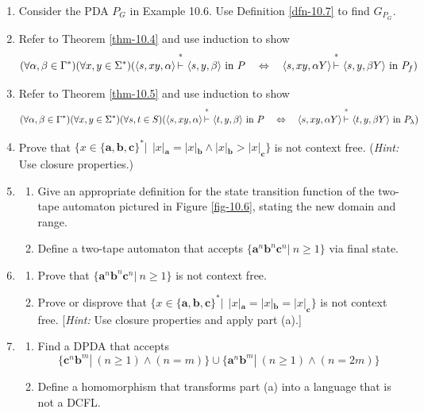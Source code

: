 \begin{enumerate}[{10.}1.]
\item Consider the PDA $P_G$ in Example 10.6. Use Definition \ref{dfn-10.7} to find
$G_{P_G}$.

\item Refer to Theorem \ref{thm-10.4} and use induction to show
\[ (\forall\alpha,\beta\in\Gamma^*)(\forall x,y\in\Sigma^*)(\langle s,xy,\alpha\rangle
	\Dvdash\langle s,y,\beta\rangle\text{ in }P \ \ \  \Leftrightarrow\ \ \ \langle s,xy,
	\alpha Y\rangle\Dvdash\langle s,y,\beta Y\rangle\text{ in }P_{  f}) \]

\item Refer to Theorem \ref{thm-10.5} and use induction to show
\[ (\forall \alpha,\beta\in\Gamma^*)(\forall x,y\in\Sigma^*)(\forall s,t\in S)
	(\langle s,xy,\alpha\rangle\Dvdash\langle t,y,\beta\rangle\text{ in }P
	 \ \ \  \Leftrightarrow\ \ \ \langle s,xy,\alpha Y\rangle\Dvdash\langle t,y,\beta Y\rangle
	\text{ in }P_{\lambda}) \]

\item Prove that $\{x\in\{\pmb{a},\pmb{b},\pmb{c}\}^*|\ \ |x|_{\pmb{a}}=|x|_{
\pmb{b}}\wedge|x|_{\pmb{b}} > |x|_{\pmb{c}}\}$ is not context free.
(\emph{Hint:} Use closure properties.)

\item \begin{enumerate}
\item Give an appropriate definition for the state transition function of
the two-tape automaton pictured in Figure \ref{fig-10.6}, stating the new domain and
range.
\item Define a two-tape automaton that accepts $\{\pmb{a}^n\pmb{b}^n\pmb{c}^n|\ n
\geq 1\}$ via final state.
\end{enumerate}

\item \begin{enumerate}
\item Prove that $\{\pmb{a}^n\pmb{b}^n\pmb{c}^n|\ n\geq 1\}$ is not context free.
\item Prove or disprove that $\{x\in\{\pmb{a},\pmb{b},\pmb{c}\}^*|\ \ |x|_{\pmb{a}}=|x|_{
\pmb{b}}=|x|_{\pmb{c}}\}$ is not context free. [\emph{Hint:} Use closure properties and apply
part (a).]
\end{enumerate}

\item \begin{enumerate}
\item Find a DPDA that accepts
\[ \{\pmb{c}^n\pmb{b}^m|\ (n\geq 1)\wedge(n=m)\}\cup\{\pmb{a}^n\pmb{b}^m|\ (n\geq 1)
	\wedge(n=2m)\} \]
\item Define a homomorphism that transforms part (a) into a language that is not
a DCFL.
\end{enumerate}


\end{enumerate}
